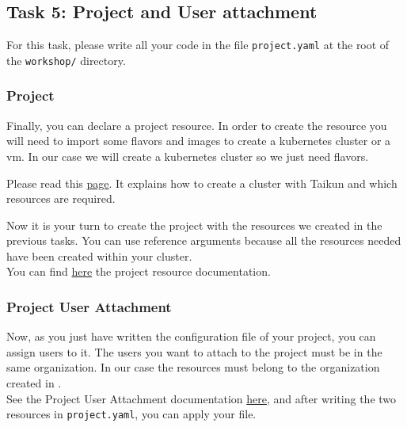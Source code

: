\subsection{Task 5: Project and User attachment}\label{sec:project}

\begin{note}
For this task, please write all your code in the file \texttt{project.yaml}
at the root of the \texttt{workshop/} directory.
\end{note}

\subsubsection{Project}

Finally, you can declare a project resource.
In order to create the resource you will need to import some flavors and images to 
create a kubernetes cluster or a vm.
In our case we will create a kubernetes cluster so we just need flavors.

\begin{tip}
Please read this \href{https://itera.gitbook.io/taikun/guidelines/creating-a-cluster}{page}.
It explains how to create a cluster with Taikun and which resources are required.
\end{tip}

Now it is your turn to create the project with the resources we created in the previous tasks. 
You can use reference arguments because all the resources needed have been created within your cluster.\\

You can find \href{https://doc.crds.dev/github.com/itera-io/provider-jet-taikun/project.taikun.jet.crossplane.io/Project/v1alpha1}{here} the project resource documentation.

\subsubsection{Project User Attachment}

Now, as you just have written the configuration file of your project, you can assign users to it.
The users you want to attach to the project must be in the same organization. In our case the 
resources must belong to the organization created in .\\

See the Project User Attachment documentation \href{https://doc.crds.dev/github.com/itera-io/provider-jet-taikun/projectuserattachment.taikun.jet.crossplane.io/UserAttachment/v1alpha1}{here}, and
after writing the two resources in \texttt{project.yaml}, you can apply your file.

